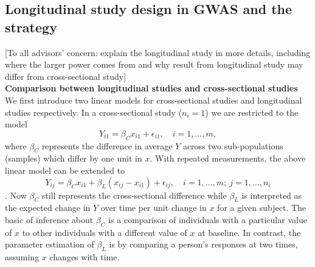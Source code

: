 \documentclass[12pt]{article}
\begin{document}
\subsection{Longitudinal study design in GWAS and the strategy}\label{sec:bg:longi}
[To all advisors' concern: explain the longitudinal study in more details, including where the larger power comes from and why result from longitudinal study may differ from cross-sectional study]\\
\textbf{Comparison between longitudinal studies and cross-sectional studies}\\
We first introduce two linear models for cross-sectional studies and longitudinal studies respectively. In a cross-sectional study ($n_i = 1$) we are restricted to the model
\begin{equation}
Y_{i1} = \beta_C x_{i1} + \epsilon_{i1}, \quad i = 1,\ldots,m,
\label{eq:crosssec}
\end{equation}
where $\beta_C$ represents the difference in average $Y$ across two sub-populations (samples) which differ by one unit in $x$. With repeated measurements, the above linear model can be extended to
\begin{equation}
Y_{ij} = \beta_C x_{i1} + \beta_L ( x_{ij} - x_{i1} ) + \epsilon_{ij}, \quad i = 1, \ldots, m; \ j = 1, \ldots, n_i 
\label{eq:longitudinal}
\end{equation}
\cite{WARE1990}. Now $\beta_C$ still represents the cross-sectional difference while $\beta_L$ is interpreted as the expected change in $Y$ over time per unit change in $x$ for a given subject. The basic of inference about $\beta_C$ is a comparison of individuals with a particular value of $x$ to other individuals with a different value of $x$ at baseline. In contrast, the parameter estimation of $\beta_L$ is by comparing a person's responses at two times, assuming $x$ changes with time.
\end{document}
